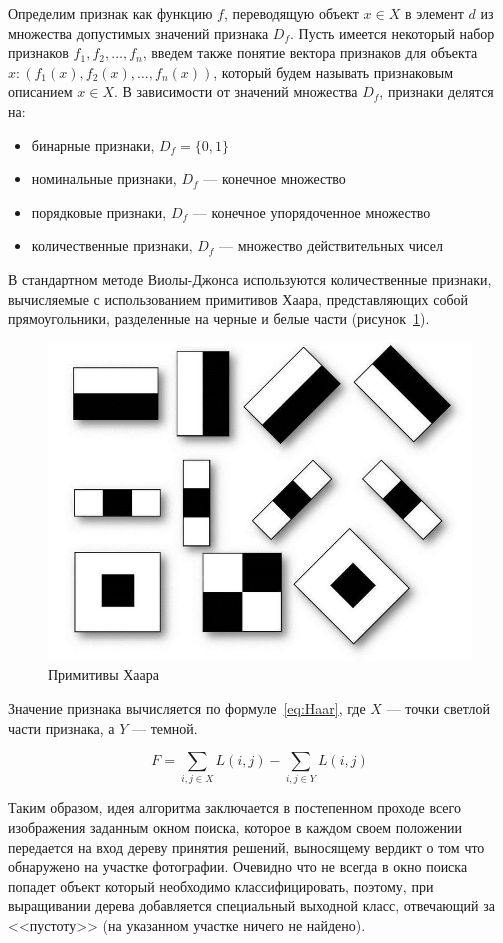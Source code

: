 \documentclass[a4paper,14pt]{extarticle} %
\begin{document}
Определим признак как функцию $f$, переводящую объект $x \in X$ в элемент $d$ из множества допустимых значений признака $D_f$. Пусть имеется некоторый набор признаков $f_1, f_2, \ldots , f_n$, введем также понятие вектора признаков для объекта $x: (f_1(x),f_2(x),\ldots,f_n(x))$, который будем называть признаковым описанием $x\in X$. В зависимости от значений множества $D_f$, признаки делятся на:

\begin{itemize}
\item бинарные признаки, $D_f=\{0, 1\}$
\item номинальные признаки, $D_f$ --- конечное множество
\item порядковые признаки, $D_f$ --- конечное упорядоченное множество
\item количественные признаки, $D_f$ --- множество действительных чисел
\end{itemize}

В стандартном методе Виолы-Джонса используются количественные признаки, вычисляемые с использованием примитивов Хаара, представляющих собой прямоугольники, разделенные на черные и белые части (рисунок~\ref{fig:Haara}).

\begin{figure}[h]
\centering
\includegraphics[width=0.69\linewidth]{Haara}
\caption{Примитивы Хаара}
\label{fig:Haara}
\end{figure}

Значение признака вычисляется по формуле~\ref{eq:Haar}, где $X$ --- точки светлой части признака, а $Y$ --- темной.

\begin{equation}\label{eq:Haar}
F=\sum\limits_{i,j \in X}L(i,j)-\sum\limits_{i,j \in Y}L(i,j)
\end{equation}

Таким образом, идея алгоритма заключается в постепенном проходе всего изображения заданным окном поиска, которое в каждом своем положении передается на вход дереву принятия решений, выносящему вердикт о том что обнаружено на участке фотографии. Очевидно что не всегда в окно поиска попадет объект который необходимо классифицировать, поэтому, при выращивании дерева добавляется специальный выходной класс, отвечающий за <<пустоту>> (на указанном участке ничего не найдено).
\end{document}
